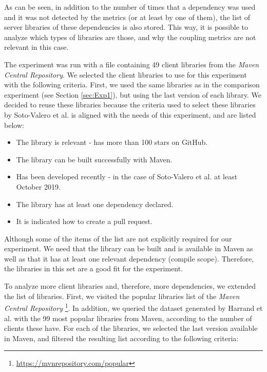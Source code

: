 As can be seen, in addition to the number of times that a dependency was used and it was not detected by the metrics (or at least by one of them), the list of server libraries of these dependencies is also stored. This way, it is possible to analyze which types of libraries are those, and why the coupling metrics are not relevant in this case.

\blankl
The experiment was run with a file containing 49 client libraries from the \textit{Maven Central Repository}.  We selected the client libraries to use for this experiment with the following criteria. First, we used the same libraries as in the comparison experiment (see Section \ref{sec:Exp1}), but using the last version of each library. We decided to reuse these libraries because the criteria used to select these libraries by Soto-Valero et al. \cite{soto2020comprehensive} is aligned with the needs of this experiment, and are listed below:

\begin{itemize}
  \item The library is relevant - has more than 100 stars on GitHub.
  \item The library can be built successfully with Maven.
  \item Has been developed recently - in the case of Soto-Valero et al. at least October 2019.
  \item The library has at least one dependency declared.
  \item It is indicated how to create a pull request.
\end{itemize}

Although some of the items of the list are not explicitly required for our experiment. We need that the library can be built and is available in Maven as well as that it has at least one relevant dependency (compile scope). Therefore, the libraries in this set are a good fit for the experiment.

To analyze more client libraries and, therefore, more dependencies, we extended the list of libraries. First, we visited the popular libraries list of the \textit{Maven Central Repository} \footnote{\url{https://mvnrepository.com/popular}}. In addition, we queried the dataset generated by Harrand et al. \cite{Harrand2019} with the 99 most popular libraries from Maven, according to the number of clients these have. For each of the libraries, we selected the last version available in Maven, and filtered the resulting list according to the following criteria:


